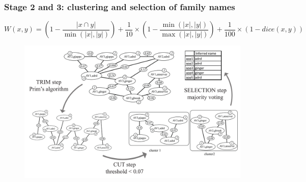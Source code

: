 \begin{frame}
    \frametitle{Stage 2 and 3: clustering and selection of family names}
    \vspace{-15pt}
    \small

    \begin{equation*}
        W(x, y) = 
        (1 - \frac{|x \cap y|}{\min(|x|, |y|)}) +
        \frac{1}{10} \times (1 - \frac{\min(|x|, |y|)}{\max(|x|, |y|)}) +
        \frac{1}{100} \times (1 - dice(x, y))
    \end{equation*}

    \begin{figure}
        \vspace{-10pt}
        \hspace*{-25pt}
        \includegraphics[width=1.05\textwidth]{figures/euphony/clustering.pdf}
    \end{figure}

\end{frame}


